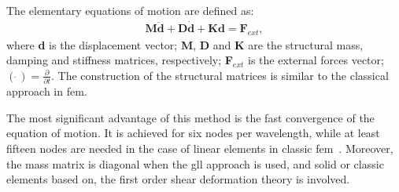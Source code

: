 The elementary equations of motion are defined as:
\begin{eqnarray}
	\label{eq:motion}
	\textbf{M} \ddot{\textbf{d}} + \textbf{D} \dot{\textbf{d}} + \textbf{K} \textbf{d} = \textbf{F}_{ext},
\end{eqnarray}
where \textbf{d} is the displacement vector; \textbf{M}, \textbf{D} and \textbf{K} are the structural mass, damping and stiffness matrices, respectively; \textbf{F}$_{ext}$ is the external forces vector; \((\dot{\ })=\frac{\partial}{\partial t}\). 
The construction of the structural matrices is similar to the classical approach in \ac{fem}.

The most significant advantage of this method is the fast convergence of the equation of motion.
It is achieved for six nodes per wavelength, while at least fifteen nodes are needed in the case of linear elements in classic \ac{fem}~\cite{wee2017simulating}.
Moreover, the mass matrix is diagonal when the \ac{gll} approach is used, and solid or classic elements based on, the first order shear deformation theory is involved.
